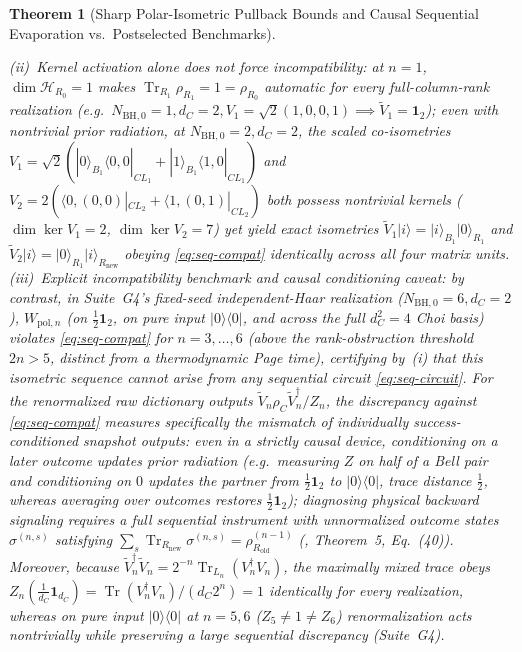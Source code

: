 \documentclass[11pt,a4paper]{article}
\newtheorem{theorem}{Theorem}
\theoremstyle{definition}
\theoremstyle{remark}
\newcommand{\Tr}{\operatorname{Tr}}
\newcommand{\cH}{\mathcal{H}}
\newcommand{\1}{\mathbf{1}}
\begin{document}
\begin{theorem}[Sharp Polar-Isometric Pullback Bounds and Causal Sequential Evaporation vs.\ Postselected Benchmarks]
\begin{enumerate}
\begin{enumerate}
    \emph{(ii)~Kernel activation alone does not force incompatibility:} at $n=1$, $\dim\cH_{R_0}=1$ makes $\Tr_{R_1}\rho_{R_1}=1=\rho_{R_0}$ automatic for every full-column-rank realization (e.g.\ $N_{\mathrm{BH},0}=1,d_C=2,V_1=\sqrt{2}(1,0,0,1)\implies\tilde{V}_1=\1_2$); even with nontrivial prior radiation, at $N_{\mathrm{BH},0}=2,d_C=2$, the scaled co-isometries $V_1=\sqrt{2}(|0\rangle_{B_1}\langle 0,0|_{CL_1}+|1\rangle_{B_1}\langle 1,0|_{CL_1})$ and $V_2=2(\langle 0,(0,0)|_{CL_2}+\langle 1,(0,1)|_{CL_2})$ both possess nontrivial kernels ($\dim\ker V_1=2$, $\dim\ker V_2=7$) yet yield exact isometries $\tilde{V}_1|i\rangle=|i\rangle_{B_1}|0\rangle_{R_1}$ and $\tilde{V}_2|i\rangle=|0\rangle_{R_1}|i\rangle_{R_{\mathrm{new}}}$ obeying \eqref{eq:seq-compat} identically across all four matrix units.
    \emph{(iii)~Explicit incompatibility benchmark and causal conditioning caveat:} by contrast, in Suite~G4's fixed-seed independent-Haar realization ($N_{\mathrm{BH},0}=6,d_C=2$), $W_{\mathrm{pol},n}$ (on $\frac{1}{2}\1_2$, on pure input $|0\rangle\langle 0|$, and across the full $d_C^2=4$ Choi basis) violates \eqref{eq:seq-compat} for $n=3,\dots,6$ (above the rank-obstruction threshold $2n>5$, distinct from a thermodynamic Page time), certifying by~(i) that this isometric sequence cannot arise from any sequential circuit \eqref{eq:seq-circuit}. For the renormalized raw dictionary outputs $\tilde{V}_n\rho_C\tilde{V}_n^\dagger/Z_n$, the discrepancy against \eqref{eq:seq-compat} measures specifically the mismatch of \emph{individually success-conditioned snapshot outputs}: even in a strictly causal device, conditioning on a later outcome updates prior radiation (e.g.\ measuring $Z$ on half of a Bell pair and conditioning on $0$ updates the partner from $\frac{1}{2}\1_2$ to $|0\rangle\langle 0|$, trace distance $\frac{1}{2}$, whereas averaging over outcomes restores $\frac{1}{2}\1_2$); diagnosing physical backward signaling requires a full sequential instrument with unnormalized outcome states $\sigma^{(n,s)}$ satisfying $\sum_s\Tr_{R_{\mathrm{new}}}\sigma^{(n,s)}=\rho_{R_{\mathrm{old}}}^{(n-1)}$ (\cite{Chiribella2009}, Theorem~5, Eq.~(40)). Moreover, because $\tilde{V}_n^\dagger\tilde{V}_n = 2^{-n}\Tr_{L_n}(V_n^\dagger V_n)$, the maximally mixed trace obeys $Z_n(\frac{1}{d_C}\1_{d_C})=\Tr(V_n^\dagger V_n)/(d_C 2^n)=1$ identically for every realization, whereas on pure input $|0\rangle\langle 0|$ at $n=5,6$ ($Z_5\neq 1\neq Z_6$) renormalization acts nontrivially while preserving a large sequential discrepancy (Suite~G4).
  \end{enumerate}
\end{enumerate}
\end{theorem}
\end{document}
